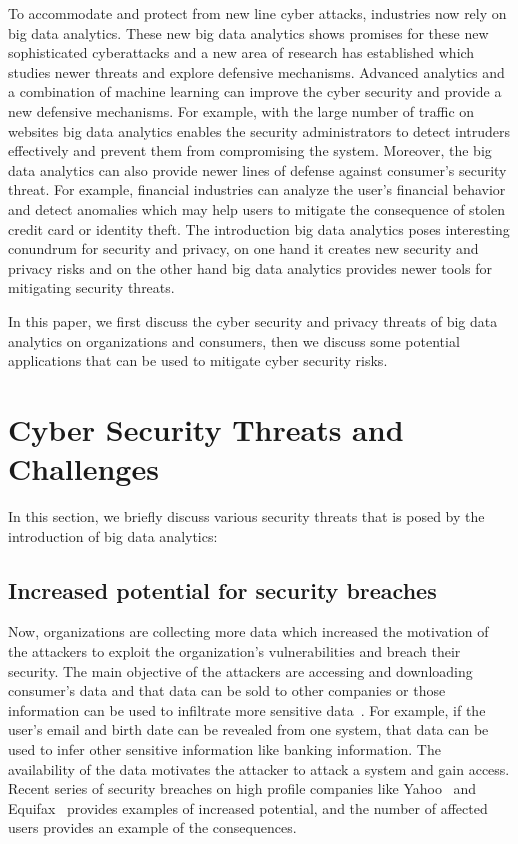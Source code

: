 \documentclass[sigconf]{acmart}
\begin{document}
To accommodate and protect from new line cyber attacks, industries now rely on big data analytics. These new big data analytics shows promises for these new sophisticated cyberattacks and a new area of research has established which studies newer threats and explore defensive mechanisms. Advanced analytics and a combination of machine learning can improve the cyber security and provide a new defensive mechanisms. For example, with the large number of traffic on websites big data analytics enables the security administrators to detect intruders effectively and prevent them from compromising the system. Moreover, the big data analytics can also provide newer lines of defense against consumer's security threat. For example, financial industries can analyze the user's financial behavior and detect anomalies which may help users to mitigate the consequence of stolen credit card or identity theft. The introduction big data analytics poses interesting conundrum for security and privacy, on one hand it creates new security and privacy risks and on the other hand big data analytics provides newer tools for mitigating security threats. 

In this paper, we first discuss the cyber security and privacy threats of big data analytics on organizations and consumers, then we discuss some potential applications that can be used to mitigate cyber security risks.

\section{Cyber Security Threats and Challenges}
In this section, we briefly discuss various security threats that is posed by the introduction of big data analytics:

\subsection{Increased potential for security breaches}
Now, organizations are collecting more data which increased the motivation of the attackers to exploit the organization's vulnerabilities and breach their security. The main objective of the attackers are accessing and downloading consumer's data and that data can be sold to other companies or those information can be used to infiltrate more sensitive data~\cite{Fhom15}. For example, if the user's email and birth date can be revealed from one system, that data can be used to infer other sensitive information like banking information. The availability of the data motivates the attacker to attack a system and gain access. Recent series of security breaches on high profile companies like Yahoo~\cite{yahoo} and Equifax~\cite{equifax} provides examples of increased potential, and the number of affected users provides an example of the consequences.
\end{document}
